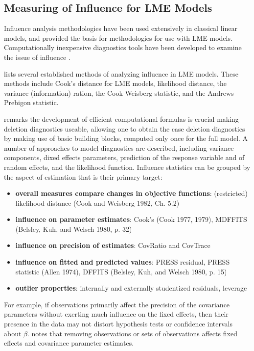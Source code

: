 \documentclass[12pt, a4paper]{report}
\theoremstyle{definition}
\theoremstyle{remark}
\begin{document}
\subsection{Measuring of Influence for LME Models}
Influence analysis methodologies have been used extensively in classical linear models, and provided the basis for methodologies for use with LME models. Computationally inexpensive diagnostics tools have been developed to examine the issue of influence \citep{Zewotir}. 

\citet{Zewotir} lists several established methods of analyzing influence in LME models. These methods include Cook's distance for LME models,
 likelihood distance,
the variance (information) ration,
the  Cook-Weisberg statistic, and
the  Andrews-Prebigon statistic.



\citet{Zewotir} remarks the development of efficient computational formulas is crucial making deletion diagnostics useable, allowing one to obtain the  case deletion diagnostics by making use of basic building blocks, computed only once for the full model. A number of approaches to model diagnostics are described, including variance components, dixed effects parameters, prediction of the response variable and of random effects, and the likelihood function. Influence statistics can be grouped by the aspect of estimation that is their primary target:
\begin{itemize}
	\item \textbf{overall measures compare changes in objective functions}: (restricted) likelihood distance (Cook and Weisberg 1982, Ch. 5.2)
	\item \textbf{influence on parameter estimates}: Cook's  (Cook 1977, 1979), MDFFITS (Belsley, Kuh, and Welsch 1980, p. 32)
	\item \textbf{influence on precision of estimates}: CovRatio and CovTrace
	\item \textbf{influence on fitted and predicted values}: PRESS residual, PRESS statistic (Allen 1974), DFFITS (Belsley, Kuh, and Welsch 1980, p. 15)
	\item \textbf{outlier properties}: internally and externally studentized residuals, leverage
\end{itemize}




For example, if observations primarily affect the precision of the covariance parameters without exerting much influence on the fixed effects, then their presence in the data may not distort hypothesis
tests or confidence intervals about $\beta$. 
\citet{schabenberger} notes that removing observations or sets of observations affects fixed effects and covariance parameter estimates.
\end{document}
